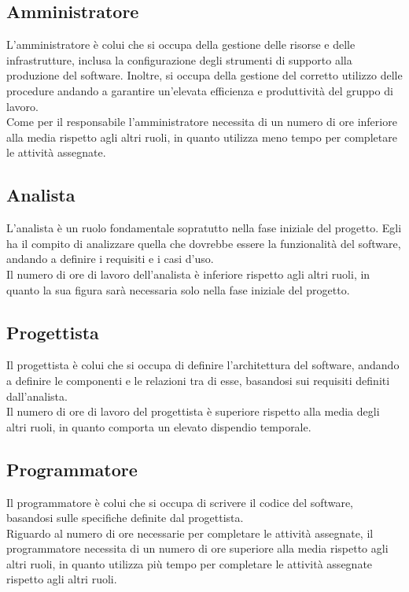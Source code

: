 \documentclass[italian,12pt]{article} %
\begin{document}
\subsection{Amministratore}
L'amministratore è colui che si occupa della gestione delle risorse e delle infrastrutture, inclusa la configurazione degli strumenti di supporto alla produzione del software.
Inoltre, si occupa della gestione del corretto utilizzo delle procedure andando a garantire un'elevata efficienza e produttività del gruppo di lavoro.\\
Come per il responsabile l'amministratore necessita di un numero di ore inferiore alla media rispetto agli altri ruoli, in quanto utilizza meno tempo per completare le attività assegnate.

\subsection{Analista}
L'analista è un ruolo fondamentale sopratutto nella fase iniziale del progetto.
Egli ha il compito di analizzare quella che dovrebbe essere la funzionalità del software, andando a definire i requisiti e i casi d'uso.\\
Il numero di ore di lavoro dell'analista è inferiore rispetto agli altri ruoli, in quanto la sua figura sarà necessaria solo nella fase iniziale del progetto.

\subsection{Progettista}
Il progettista è colui che si occupa di definire l'architettura del software, andando a definire le componenti e le relazioni tra di esse, basandosi sui requisiti definiti dall'analista.\\
Il numero di ore di lavoro del progettista è superiore rispetto alla media degli altri ruoli, in quanto comporta un elevato dispendio temporale.

\subsection{Programmatore}
Il programmatore è colui che si occupa di scrivere il codice del software, basandosi sulle specifiche definite dal progettista.\\
Riguardo al numero di ore necessarie per completare le attività assegnate, il programmatore necessita di un numero di ore superiore alla media rispetto agli altri ruoli,
in quanto utilizza più tempo per completare le attività assegnate rispetto agli altri ruoli.
\end{document}
